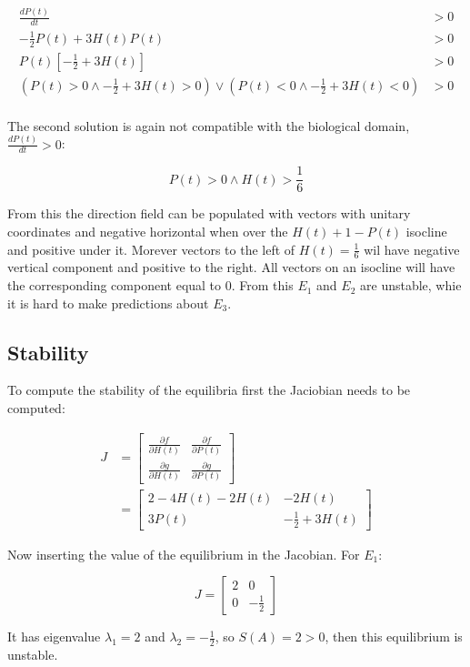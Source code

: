   \begin{align*}
    \frac{dP(t)}{dt} &> 0\\
    -\frac{1}{2}P(t) + 3H(t)P(t) &> 0\\
    P(t)\left[-\frac{1}{2} + 3H(t)\right] &> 0\\
    (P(t) > 0\land -\frac{1}{2}+3H(t) >0)\lor (P(t) < 0\land -\frac{1}{2}+3H(t) <0) &> 0\\
  \end{align*}

  The second solution is again not compatible with the biological domain, $\frac{dP(t)}{dt} >0$:

  $$P(t) > 0\land H(t) >\frac{1}{6}$$

  From this the direction field can be populated with vectors with unitary coordinates and negative horizontal when over the $H(t) + 1-P(t)$ isocline and positive under it.
  Morever vectors to the left of $H(t) = \frac{1}{6}$ wil have negative vertical component and positive to the right.
  All vectors on an isocline will have the corresponding component equal to $0$.
  From this $E_1$ and $E_2$ are unstable, whie it is hard to make predictions about $E_3$.

  \subsection{Stability}
  To compute the stability of the equilibria first the Jaciobian needs to be computed:

  \begin{align*}
    J &= \begin{bmatrix} \frac{\partial f}{\partial H(t)} & \frac{\partial f}{\partial P(t)}\\ \frac{\partial g}{\partial H(t)} & \frac{\partial g}{\partial P(t)} \end{bmatrix}\\
      &=\begin{bmatrix} 2- 4H(t) -2H(t) & -2H(t)\\3P(t) & -\frac{1}{2} + 3H(t)\end{bmatrix}
  \end{align*}

  Now inserting the value of the equilibrium in the Jacobian.
  For $E_1$:

  $$J = \begin{bmatrix}2 & 0\\ 0 & -\frac{1}{2}\end{bmatrix}$$

  It has eigenvalue $\lambda_1 = 2$ and $\lambda_2 = -\frac{1}{2}$, so $S(A)= 2>0$, then this equilibrium is unstable.\\

